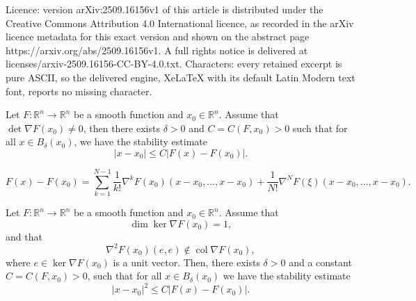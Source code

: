 \documentclass[10pt,a4paper]{amsart}
\def\R{{\mathbb{R}}}
\def\erre{{\mathbb{R}}}
\begin{document}
Licence: version arXiv:2509.16156v1 of this article is distributed under the Creative Commons Attribution 4.0 International licence, as recorded in the arXiv licence metadata for this exact version and shown on the abstract page https://arxiv.org/abs/2509.16156v1. A full rights notice is delivered at licenses/arxiv-2509.16156-CC-BY-4.0.txt. Characters: every retained excerpt is pure ASCII, so the delivered engine, XeLaTeX with its default Latin Modern text font, reports no missing character.
\begin{lemma} \label{lemma:grad_neq0}
        Let $F:\erre^n \to\erre^n$ be a smooth function and $x_0\in \R^n$. Assume that $\det\nabla F(x_0)\neq0$, then there exists $\delta>0$ and $C=C(F,x_0)>0$ such that for all $x\in B_\delta(x_0)$, we have the stability estimate
        \begin{equation}\label{eq:grad_neq0}
            |x-x_0|\leq C |F(x)-F(x_0)|.
        \end{equation}
\end{lemma}

\begin{equation}
    F(x)-F(x_0)=\sum_{k=1}^{N-1}\frac{1}{k!}\nabla^kF(x_0)(x-x_0,\dots,x-x_0)+\frac{1}{N!}\nabla^NF(\xi)(x-x_0,\dots,x-x_0). \label{eq:taylor_expansion}
\end{equation}

\begin{lemma} \label{lemma:ker_1dim}
    Let $F:\erre^n\to\erre^n$ be a smooth function and $x_0\in \R^n$. Assume that
    \begin{equation*}
        \dim\ker\nabla F(x_0)=1,
    \end{equation*}
    and that
    \begin{equation}
        \nabla^2F(x_0)(e,e)\notin \operatorname{col}\nabla F(x_0),
        \label{eq:1dimker_crucial_assumption}
    \end{equation}
    where $e\in\ker\nabla F(x_0)$ is a unit vector. Then, there exists $\delta>0$ and a constant $C=C(F,x_0)>0$, such that for all $x\in B_\delta(x_0)$ we have the stability estimate
    \begin{equation}\label{eq:ker_1dim}
        |x-x_0|^2\leq C|F(x)-F(x_0)|.
    \end{equation}
\end{lemma}
\end{document}
